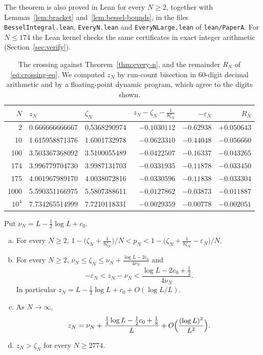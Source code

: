The theorem is also proved in Lean for every $N\ge2$, together with Lemmas~\ref{lem:bracket}
and~\ref{lem:bessel-bounds}, in the files \texttt{BesselIntegral.lean}, \texttt{EveryN.lean} and
\texttt{EveryNLarge.lean} of \texttt{lean/PaperA}. For $N\le174$ the Lean kernel checks the same
certificates in exact integer arithmetic (Section~\ref{sec:verify}).

\begin{table}[ht]
\centering\small
\begin{tabular}{@{}rllrrr@{}}
\toprule
$N$ & $z_N$ & $\zeta_N$ & $z_N-\zeta_N-\frac1{8\zeta_N}$ & $-\varepsilon_N$ & $R_N$\\
\midrule
2 & 0.666666666667 & 0.5368290974 & $-0.1030112$ & $-0.62938$ & $+0.050643$\\
10 & 1.615958871376 & 1.6001732978 & $-0.0623310$ & $-0.44048$ & $-0.056660$\\
100 & 3.503367368092 & 3.5100055489 & $-0.0422507$ & $-0.16337$ & $-0.043265$\\
174 & 3.996779704730 & 3.9987131703 & $-0.0331935$ & $-0.11878$ & $-0.033450$\\
175 & 4.001967989170 & 4.0038072816 & $-0.0330596$ & $-0.11838$ & $-0.033304$\\
1000 & 5.590351166975 & 5.5807388611 & $-0.0127862$ & $-0.03873$ & $-0.011887$\\
$10^4$ & 7.734265514999 & 7.7210118331 & $-0.0029359$ & $-0.00778$ & $-0.002051$\\
\bottomrule
\end{tabular}
\caption{The crossing against Theorem~\ref{thm:every-n}, and the remainder $R_N$ of
\eqref{eq:crossing-eq}. We computed $z_N$ by run-count bisection in 60-digit decimal arithmetic
and by a floating-point dynamic program, which agree to the digits shown.}
\label{tab:every-n}
\end{table}

\begin{corollary}\label{cor:every-n}
Put $\nu_N=L-\frac12\log L+c_0$.
\begin{enumerate}[(a)]
\item For every $N\ge2$,
$1-\bigl(\zeta_N+\frac1{8\zeta_N}\bigr)/N<p_N<1-\bigl(\zeta_N+\frac1{8\zeta_N}-\varepsilon_N\bigr)/N$.
\item For every $N\ge2$, $\nu_N\le\zeta_N\le\nu_N+\frac{\log L-2c_0}{4\nu_N}$ and
\begin{equation}\label{eq:secondorder}
-\varepsilon_N<z_N-\nu_N<\frac{\log L-2c_0+\frac12}{4\nu_N}.
\end{equation}
In particular $z_N=L-\frac12\log L+c_0+O(\log L/L)$.
\item As $N\to\infty$,
\begin{equation}\label{eq:thirdorder}
z_N=\nu_N+\frac{\frac14\log L-\frac12c_0+\frac18}{L}+O\Bigl(\frac{(\log L)^2}{L^2}\Bigr).
\end{equation}
\item $z_N>\zeta_N$ for every $N\ge2774$.
\end{enumerate}
\end{corollary}

